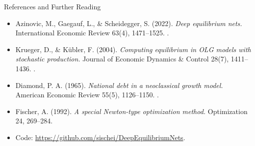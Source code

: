 \documentclass[aspectratio=169,11pt]{beamer}
\begin{document}
\begin{frame}{References and Further Reading}
\small
\begin{itemize}\itemsep3pt
    \item Azinovic, M., Gaegauf, L., \& Scheidegger, S. (2022). \emph{Deep equilibrium nets.} International Economic Review 63(4), 1471--1525.  .

    \item Krueger, D., \& K\"ubler, F. (2004). \emph{Computing equilibrium in OLG models with stochastic production.} Journal of Economic Dynamics \& Control 28(7), 1411--1436.  .

    \item Diamond, P. A. (1965). \emph{National debt in a neoclassical growth model.} American Economic Review 55(5), 1126--1150.  .

    \item Fischer, A. (1992). \emph{A special Newton-type optimization method.} Optimization 24, 269--284.  

    \item Code: \scriptsize\url{https://github.com/sischei/DeepEquilibriumNets}.
\end{itemize}
\end{frame}
\end{document}
